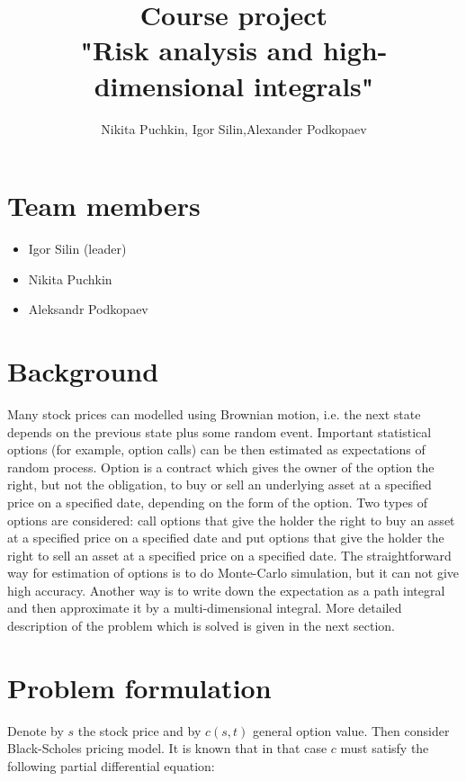 \documentclass[11pt,a4paper]{extarticle}
\title{Course project \\
"Risk analysis and high-dimensional integrals"}
\author{ Nikita Puchkin, Igor Silin,Alexander Podkopaev }
\begin{document}
\maketitle

\section{Team members}

\begin{itemize}

\item Igor Silin (leader)

\item Nikita Puchkin

\item Aleksandr Podkopaev

\end{itemize}

\section{Background}

Many stock prices can modelled using Brownian motion, i.e. the next state depends on the previous state plus some random event. Important statistical options (for example, option calls) can be then estimated as expectations of random process. Option is a contract which gives the owner of the option the right, but not the obligation, to buy or sell an underlying asset at a specified price on a specified date, depending on the form of the option. Two types of options are considered: call options that give the holder the right to buy an asset at a specified price on a specified date and put options that give the holder the right to sell an asset at a specified price on a specified date. The straightforward way for estimation of options is to do Monte-Carlo simulation, but it can not give high accuracy. Another way is to write down the expectation as a path integral and then approximate it by a multi-dimensional integral. More detailed description of the problem which is solved is given in the next section.

\section{Problem formulation}

Denote by $s$ the stock price and by $c(s,t)$ general option value. Then consider Black-Scholes pricing model. It is known that in that case $c$ must satisfy the following partial differential equation: 
\end{document}
